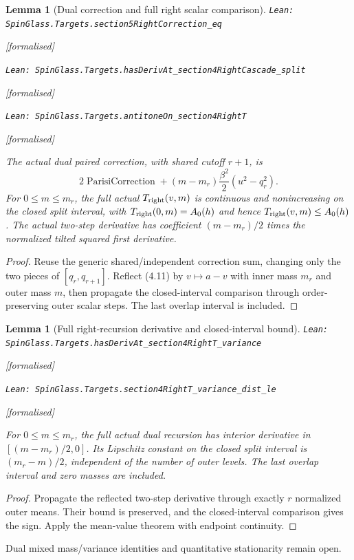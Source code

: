 \documentclass[11pt]{article}
\providecommand{\lean}[1]{\leavevmode\par\nopagebreak
  {\noindent\normalfont\footnotesize\raggedright\texttt{Lean: #1}\par}\nopagebreak}
\providecommand{\leanok}{\par\nopagebreak
  {\noindent\normalfont\footnotesize\textcolor{green!50!black}{[formalised]}\par}\nopagebreak}
\newtheorem{lemma}[theorem]{Lemma}
\begin{document}
\begin{lemma}[Dual correction and full right scalar comparison]
\lean{SpinGlass.Targets.section5RightCorrection\_eq}\leanok
\lean{SpinGlass.Targets.hasDerivAt\_section4RightCascade\_split}\leanok
\lean{SpinGlass.Targets.antitoneOn\_section4RightT}\leanok
The actual dual paired correction, with shared cutoff $r+1$, is
\[
 2\operatorname{ParisiCorrection}
 +(m-m_r)\frac{\beta^2}{2}(u^2-q_r^2).
\]
For $0\le m\le m_r$, the full actual $T_{\rm right}(v,m)$ is continuous and
nonincreasing on the closed split interval, with
$T_{\rm right}(0,m)=A_0(h)$ and hence $T_{\rm right}(v,m)\le A_0(h)$.
The actual two-step derivative has coefficient $(m-m_r)/2$ times the
normalized tilted squared first derivative.
\end{lemma}
\begin{proof}
Reuse the generic shared/independent correction sum, changing only the two
pieces of $[q_r,q_{r+1}]$. Reflect (4.11) by $v\mapsto a-v$ with inner mass
$m_r$ and outer mass $m$, then propagate the closed-interval comparison through
order-preserving outer scalar steps. The last overlap interval is included.
\end{proof}
\begin{lemma}[Full right-recursion derivative and closed-interval bound]
\lean{SpinGlass.Targets.hasDerivAt\_section4RightT\_variance}\leanok
\lean{SpinGlass.Targets.section4RightT\_variance\_dist\_le}\leanok
For $0\le m\le m_r$, the full actual dual recursion has interior derivative
in $[(m-m_r)/2,0]$. Its Lipschitz constant on the closed split interval is
$(m_r-m)/2$, independent of the number of outer levels. The last overlap
interval and zero masses are included.
\end{lemma}
\begin{proof}
Propagate the reflected two-step derivative through exactly $r$ normalized
outer means. Their bound is preserved, and the closed-interval comparison
gives the sign. Apply the mean-value theorem with endpoint continuity.
\end{proof}
Dual mixed mass/variance identities and quantitative stationarity remain open.
\end{document}
